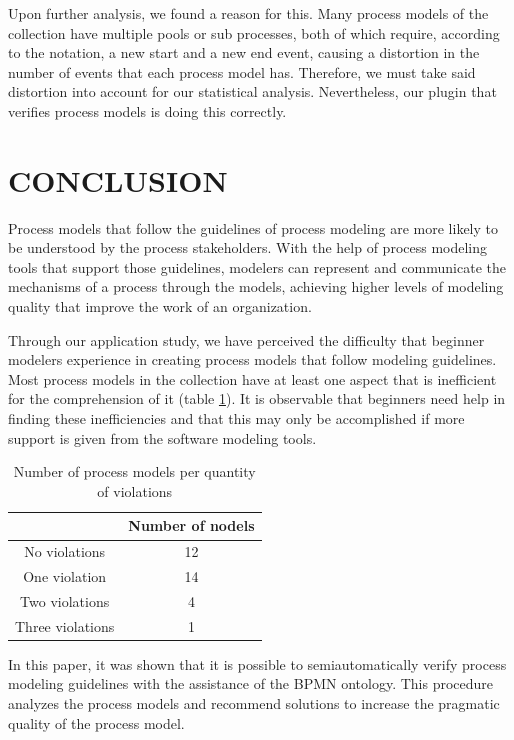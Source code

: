 \documentclass[a4paper,twoside]{article}
\begin{document}
Upon further analysis, we found a reason for this. Many process models of the collection have multiple pools or sub processes, both of which require, according to the notation, a new start and a new end event, causing a distortion in the number of events that each process model has. Therefore, we must take said distortion into account for our statistical analysis. Nevertheless, our plugin that verifies process models is doing this correctly.


\section{CONCLUSION}\label{Conclusion}

\noindent Process models that follow the guidelines of process modeling are more likely to be understood by the process stakeholders. With the help of process modeling tools that support those guidelines, modelers can represent and communicate the mechanisms of a process through the models, achieving higher levels of modeling quality that improve the work of an organization.

Through our application study, we have perceived the difficulty that beginner modelers experience in creating process models that follow modeling guidelines. Most process models in the collection have at least one aspect that is inefficient for the comprehension of it (table \ref{ModelsPerQuantityOfViolation}). It is observable that beginners need help in finding these inefficiencies and that this may only be accomplished if more support is given from the software modeling tools.

\begin{table}[]
	\centering
	\caption{Number of process models per quantity of violations}
	\label{ModelsPerQuantityOfViolation}
	\begin{tabular}{|c|c|}
		\hline
		& Number of nodels \\ \hline
		No violations & 12 \\ \hline
		One violation & 14 \\ \hline
		Two violations & 4 \\ \hline
		Three violations & 1 \\ \hline
	\end{tabular}
\end{table}

In this paper, it was shown that it is possible to semiautomatically verify process modeling guidelines with the assistance of the BPMN ontology. This procedure analyzes the process models and recommend solutions to increase the pragmatic quality of the process model.
\end{document}
